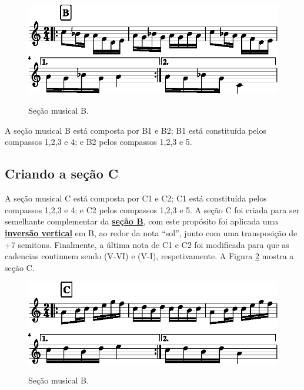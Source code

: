      \begin{figure}[H]
	     \centering
	     \href{https://drive.google.com/file/d/1sboVxQVuClw1le1CEwtFyGOblwjdVTpd/view?usp=sharing}{\includegraphics[width=\textwidth]{chapters/cap-musica-topicos/section-b-1.eps}}
	     \caption{Seção musical B.}
	     \label{fig:section-b}
     \end{figure}
A seção musical B está composta por B1 e B2; B1 está constituída pelos compassos 1,2,3 e 4; e B2 pelos compassos 1,2,3 e 5.

\subsection{Criando a seção C}
\label{subsec:criandoc}
A seção musical C está composta por C1 e C2; 
C1 está constituída pelos compassos 1,2,3 e 4; e C2 pelos compassos 1,2,3 e 5.
A seção C foi criada para ser semelhante complementar da \hyperref[subsec:criandoa]{\textbf{seção B}},
com este propósito foi aplicada uma \hyperref[subsec:inversaovertical]{\textbf{inversão vertical}} em B,
ao redor da nota ``sol'', junto com uma transposição de +7 semitons.
Finalmente, a última nota de C1 e C2 foi modificada para que as cadencias continuem sendo (V-VI)  e (V-I),
respetivamente. 
A Figura \ref{fig:section-c} mostra a seção C.
     \begin{figure}[H]
	     \centering
	     \href{https://drive.google.com/file/d/1Z579dnspYxfRsBRGK-HfRwlppM2fr37L/view?usp=sharing}{\includegraphics[width=\textwidth]{chapters/cap-musica-topicos/section-c-1.eps}}
	     \caption{Seção musical B.}
	     \label{fig:section-c}
     \end{figure}

